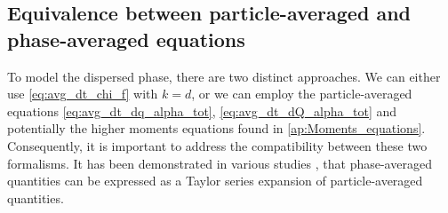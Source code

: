 
\subsection{Equivalence between particle-averaged and phase-averaged equations}
\label{sec:equivalence}
To model the dispersed phase, there are two distinct approaches. 
We can either use \ref{eq:avg_dt_chi_f} with $k=d$, or we can employ the particle-averaged equations \ref{eq:avg_dt_dq_alpha_tot}, \ref{eq:avg_dt_dQ_alpha_tot} and potentially the higher moments equations found in \ref{ap:Moments_equations}.
Consequently, it is important to address the compatibility between these two formalisms.
It has been demonstrated in various studies \citep{buyevich1979flow,lhuillier1992ensemble,jackson1997locally,zhang1994averaged}, that phase-averaged quantities can be expressed as a Taylor series expansion of particle-averaged quantities. 
